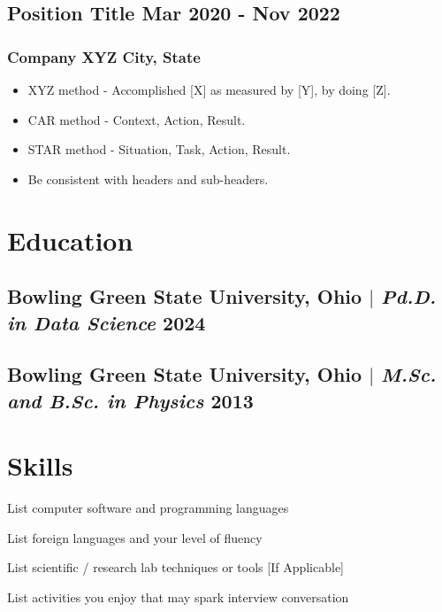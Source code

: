 \documentclass[11pt]{article} %
\begin{document}
\subsection{Position Title \hfill Mar 2020 - Nov 2022}
\subsubsection{Company XYZ \hfill City, State}
\begin{itemize}
	\item XYZ method - Accomplished [X] as measured by [Y], by doing [Z].
	\item CAR method - Context, Action, Result. 
	\item STAR method - Situation, Task, Action, Result.
	\item Be consistent with headers and sub-headers. 
\end{itemize}

\section{Education}
\subsection{Bowling Green State University, Ohio $|$ {\normalfont\itshape Pd.D. in Data Science} \hfill 2024} 

\subsection{Bowling Green State University, Ohio $|$ {\normalfont\itshape M.Sc. and B.Sc. in Physics} \hfill 2013} 

\vspace{\baselineskip}

\section{Skills}
\begin{description}[itemsep=0pt]
	\item[Technical] List computer software and programming languages
	\item[Language] List foreign languages and your level of fluency
	\item[Laboratory] List scientific / research lab techniques or tools [If Applicable]
	\item[Interests] List activities you enjoy that may spark interview conversation
\end{description}
\end{document}
